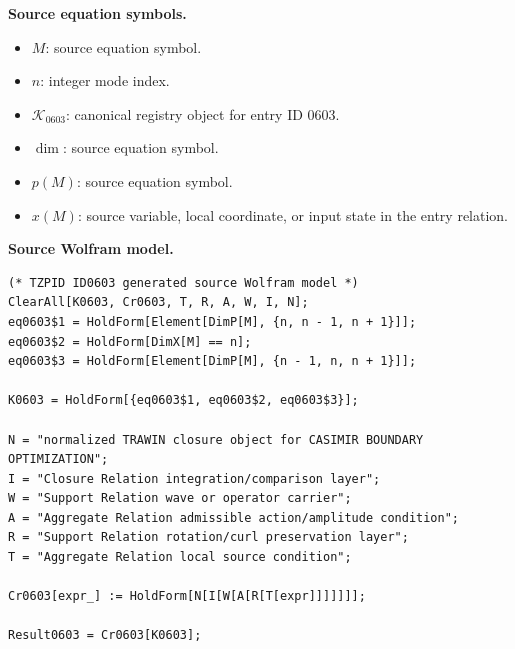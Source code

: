 \begin{minipage}[t]{0.49\linewidth}
\begingroup
\small
\raggedright
\textbf{Source equation symbols.}\par
\begin{itemize}[leftmargin=1.35em,itemsep=1pt,topsep=1pt,parsep=0pt]
    \item $M$: source equation symbol.
    \item $n$: integer mode index.
    \item $\mathcal{K}_{0603}$: canonical registry object for entry ID 0603.
    \item $\dim$: source equation symbol.
    \item $p(M)$: source equation symbol.
    \item $x(M)$: source variable, local coordinate, or input state in the entry relation.
\end{itemize}
\endgroup
\end{minipage}\hfill
\begin{minipage}[t]{0.47\linewidth}
\begingroup
\scriptsize
\raggedright
\textbf{Source Wolfram model.}\par
\begin{Verbatim}[fontsize=\tiny,breaklines=true,breakanywhere=true]
(* TZPID ID0603 generated source Wolfram model *)
ClearAll[K0603, Cr0603, T, R, A, W, I, N];
eq0603$1 = HoldForm[Element[DimP[M], {n, n - 1, n + 1}]];
eq0603$2 = HoldForm[DimX[M] == n];
eq0603$3 = HoldForm[Element[DimP[M], {n - 1, n, n + 1}]];

K0603 = HoldForm[{eq0603$1, eq0603$2, eq0603$3}];

N = "normalized TRAWIN closure object for CASIMIR BOUNDARY OPTIMIZATION";
I = "Closure Relation integration/comparison layer";
W = "Support Relation wave or operator carrier";
A = "Aggregate Relation admissible action/amplitude condition";
R = "Support Relation rotation/curl preservation layer";
T = "Aggregate Relation local source condition";

Cr0603[expr_] := HoldForm[N[I[W[A[R[T[expr]]]]]]];

Result0603 = Cr0603[K0603];
\end{Verbatim}
\endgroup
\end{minipage}

